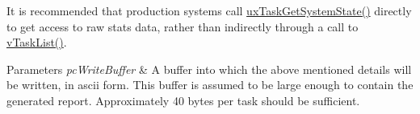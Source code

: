 It is recommended that production systems call \mbox{\hyperlink{task_8h_ade68760111c37287a3b82c41dff8ec7d}{ux\+Task\+Get\+System\+State()}} directly to get access to raw stats data, rather than indirectly through a call to \mbox{\hyperlink{task_8h_a094a608b1b19b9d3cb41254661653ec2}{v\+Task\+List()}}.


\begin{DoxyParams}{Parameters}
{\em pc\+Write\+Buffer} & A buffer into which the above mentioned details will be written, in ascii form. This buffer is assumed to be large enough to contain the generated report. Approximately 40 bytes per task should be sufficient. \\
\hline
\end{DoxyParams}

